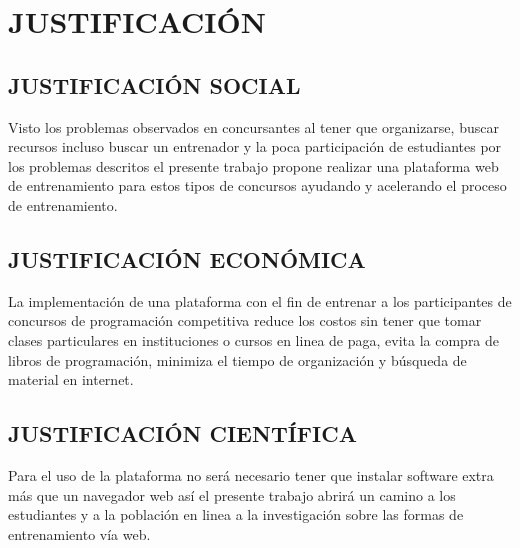 \section{JUSTIFICACIÓN}
    \subsection{JUSTIFICACIÓN SOCIAL}
    Visto los problemas observados en concursantes al tener que organizarse, buscar recursos incluso buscar un entrenador y la poca participación de estudiantes por los problemas descritos el presente trabajo propone realizar una plataforma web de entrenamiento para estos tipos de concursos ayudando y acelerando el proceso de entrenamiento.
    \subsection{JUSTIFICACIÓN ECONÓMICA}
    La implementación de una plataforma con el fin de entrenar a los participantes de concursos de programación competitiva reduce los costos sin tener que tomar clases particulares en instituciones o cursos en linea de paga, evita la compra de libros de programación, minimiza el tiempo de organización y búsqueda de material en internet.
    \subsection{JUSTIFICACIÓN CIENTÍFICA}
    Para el uso de la plataforma no será necesario tener que instalar software extra más que un navegador web así el presente trabajo  abrirá un camino a los estudiantes y a la población en linea a la investigación sobre las formas de entrenamiento vía web.